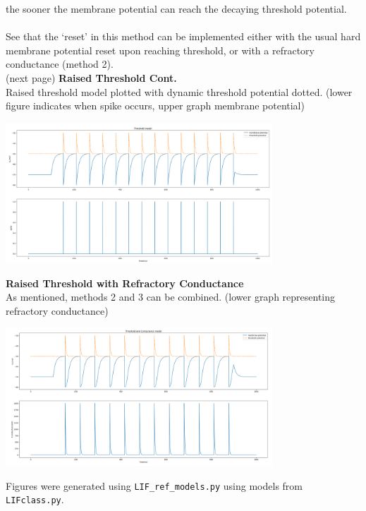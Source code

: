 \documentclass{report}
\begin{document}
the sooner the membrane potential can reach the decaying threshold potential.\\
\vspace{1mm}\\
See that the `reset' in this method can be implemented either with the usual hard membrane potential reset upon reaching threshold, or with a refractory conductance (method 2).\\
(next page)\newpage
\noindent\textbf{Raised Threshold Cont.}\\
Raised threshold model plotted with dynamic threshold potential dotted. (lower figure indicates when spike occurs, upper graph membrane potential)
\begin{center}
\includegraphics[width=10cm]{8}\\
\end{center}
\textbf{Raised Threshold with Refractory Conductance}\\
As mentioned, methods 2 and 3 can be combined. (lower graph representing refractory conductance)
\begin{center}
\includegraphics[width=10cm]{9}\\
\end{center}
Figures were generated using \texttt{LIF\_ref\_models.py} using models from\\ \texttt{LIFclass.py}.
\newpage
\end{document}
